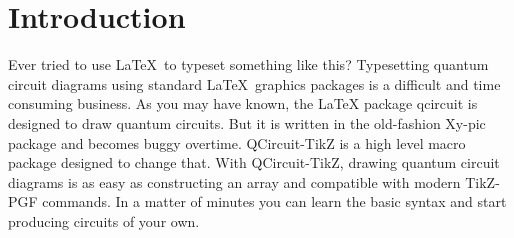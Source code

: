\documentclass[twocolumn,nofootinbib,aps,,pra]{revtex4-1}
\newcommand{\ket}[1]{\ensuremath{\left|#1\right\rangle}}
\begin{document}
\section{Introduction}
\setcounter{footnote}{1}
Ever tried to use \LaTeX\ to typeset something like this?
%
Typesetting quantum circuit diagrams using standard \LaTeX\ graphics packages is a difficult and time consuming business. 
As you may have known, the LaTeX package qcircuit is designed to draw quantum circuits.
But it is written in the old-fashion Xy-pic package and becomes buggy overtime.
QCircuit-TikZ is a high level macro package designed to change that. 
With QCircuit-TikZ, drawing quantum circuit diagrams is as easy as constructing an array and compatible with modern TikZ-PGF commands. 
In a matter of minutes you can learn the basic syntax and start producing circuits of your own.
\end{document}
